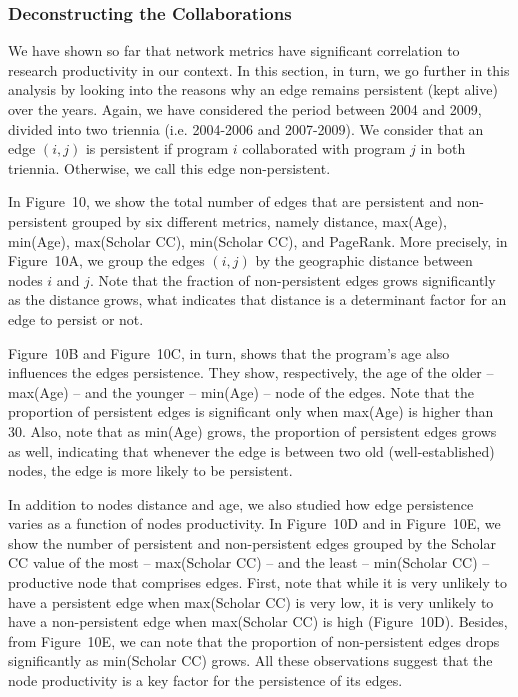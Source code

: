 \documentclass[10pt]{article}
\begin{document}
\subsubsection*{Deconstructing the Collaborations}

We have shown so far that network metrics have significant correlation to 
research productivity in our context. In this section, in turn, we go
further in this analysis by looking into the reasons why an edge remains persistent (kept alive) over the years.
Again, we have considered the period between 2004 and 2009, divided into two triennia (i.e.
2004-2006 and 2007-2009). We consider that an edge $(i,j)$ is persistent if program $i$ collaborated
with program $j$ in both triennia. Otherwise, we call this edge non-persistent.

In Figure~10, we show the total number of edges that are persistent and
non-persistent grouped by six different metrics, namely distance, max(Age), min(Age), max(Scholar
CC), min(Scholar CC), and PageRank.
More precisely, in Figure~10A, we group the edges $(i,j)$ by the geographic distance
between nodes $i$ and $j$. Note that the fraction of non-persistent edges grows significantly as the
distance grows, what indicates that distance is a determinant factor for an edge to persist or not. 

Figure~10B and Figure~10C, in turn, shows that the program's age also influences
the edges persistence. They show, respectively, 
the age of the older -- max(Age) --  and the younger -- min(Age) --  node of the edges.
Note that the proportion of persistent edges is significant only when max(Age) is higher than 30.
Also, note that as min(Age) grows, the proportion of persistent edges grows as well, indicating that
whenever the edge is between two old (well-established) nodes, the edge is more likely to be
persistent.

In addition to nodes distance and age, we also studied how edge persistence varies as a function of
nodes productivity. 
In Figure~10D and in Figure~10E,  we show the number of persistent and non-persistent edges 
grouped by the Scholar CC value of the most -- max(Scholar CC) --  and the least -- min(Scholar CC)
-- productive node that comprises edges.
First, note that while it is very unlikely to have a persistent edge when max(Scholar CC) is very
low, it is very unlikely to have a non-persistent edge when max(Scholar CC) is high
(Figure~10D). Besides, from Figure~10E, we can note that the proportion of
non-persistent edges drops significantly as min(Scholar CC) grows. All these observations suggest
that the node productivity is a key factor for the persistence of its edges. 
\end{document}
